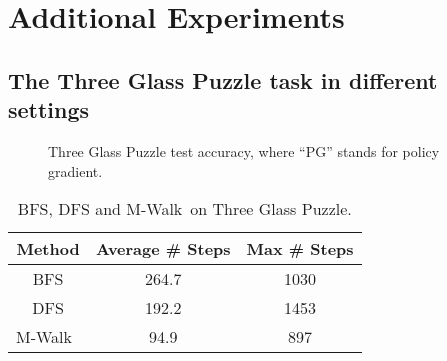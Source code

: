 \documentclass{article}
\newcommand{\modelname}{M-Walk}
\begin{document}
\section{Additional Experiments}
\label{Appendix:AdditionalExperiments}
\subsection{The Three Glass Puzzle task in different settings}
\label{Appendix:MCTSTesting}


	
	\begin{figure}[t!]
		\centering
		\caption{Three Glass Puzzle test accuracy, where ``PG'' stands for policy gradient.}
		\label{fig:puzzle_test_accuracy}
	\end{figure}

	\begin{table}[t]
		\centering
		\caption{Three Glass Puzzle test accuracy (\%), where ``Beam'' denotes beam search.}
		\label{tab:lp_results}
	\end{table}
	
		\begin{table}[t]
		\centering
		{\caption{BFS, DFS and \modelname~on Three Glass Puzzle.}
			\label{tab:graph_traversal_results}
			\begin{tabular}{|c|c|c|}
				\hline
				{Method} & {Average \# Steps} & {Max \# Steps} \\
				\hline
				BFS & 264.7 & 1030 \\
				DFS & 192.2 & 1453 \\
				\modelname~& 94.9 & 897 \\
				\hline
			\end{tabular}
		}
	\end{table}
	
\end{document}
